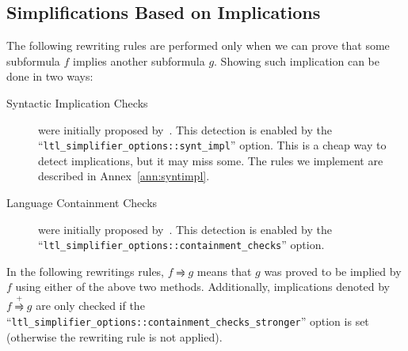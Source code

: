 \documentclass[a4paper,twoside,10pt,DIV=12,draft]{scrreprt}
\newcommand{\0}{\texttt{0}}
\newcommand{\1}{\texttt{1}}
\def\simp{\rightrightharpoons}
\def\Simp{\stackrel{+}{\simp}}
\begin{document}
\subsection{Simplifications Based on Implications}
\label{sec:syntimpl}

The following rewriting rules are performed only when we can prove
that some subformula $f$ implies another subformula $g$.  Showing such
implication can be done in two ways:
\begin{description}
\item[Syntactic Implication Checks] were initially proposed
  by~\citet{somenzi.00.cav}.  This detection is enabled by the
  ``\verb|ltl_simplifier_options::synt_impl|'' option.  This is a
  cheap way to detect implications, but it may miss some.  The rules
  we implement are described in Annex~\ref{ann:syntimpl}.

\item[Language Containment Checks] were initially proposed
  by~\citet{tauriainen.03.a83}.  This detection is enabled by the
  ``\verb|ltl_simplifier_options::containment_checks|'' option.
\end{description}

In the following rewritings rules, $f\simp g$ means that $g$ was
proved to be implied by $f$ using either of the above two methods.
Additionally, implications denoted by $f\Simp g$ are only checked
if the ``\verb|ltl_simplifier_options::containment_checks_stronger|''
option is set (otherwise the rewriting rule is not applied).
\end{document}
